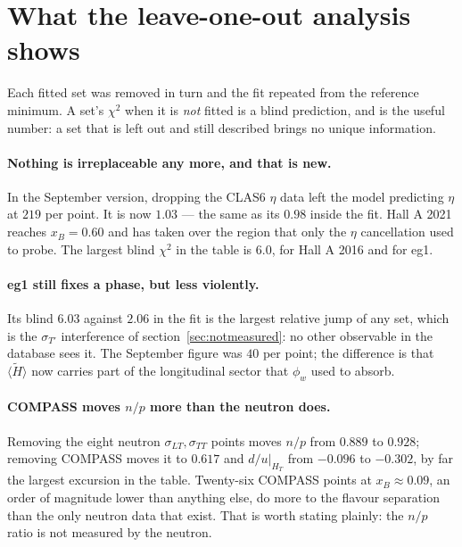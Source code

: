 \documentclass[11pt,a4paper]{article}
\newcommand{\sig}[1]{\sigma_{#1}}
\begin{document}
\section{What the leave-one-out analysis shows}

Each fitted set was removed in turn and the fit repeated from the reference
minimum.  A set's $\chi^2$ when it is \emph{not} fitted is a blind prediction,
and is the useful number: a set that is left out and still described brings no
unique information.

\begin{table}[htb]
\centering\small
\caption{Blind $\chi^2$ per point of the removed set, against its $\chi^2$ per
point in the reference fit, and the effect on two derived quantities.  Sorted
by blind $\chi^2$.}
\label{tab:loo}

\end{table}

\paragraph{Nothing is irreplaceable any more, and that is new.}  In the
September version, dropping the CLAS6 $\eta$ data left the model predicting
$\eta$ at $219$ per point.  It is now $1.03$ --- the same as its $0.98$ inside
the fit.  Hall A 2021 reaches $x_B = 0.60$ and has taken over the region that
only the $\eta$ cancellation used to probe.  The largest blind $\chi^2$ in the
table is $6.0$, for Hall A 2016 and for eg1.

\paragraph{eg1 still fixes a phase, but less violently.}  Its blind $6.03$
against $2.06$ in the fit is the largest relative jump of any set, which is the
$\sig{T'}$ interference of section~\ref{sec:notmeasured}: no other observable in
the database sees it.  The September figure was $40$ per point; the difference
is that $\langle\tilde H\rangle$ now carries part of the longitudinal sector
that $\phi_w$ used to absorb.

\paragraph{COMPASS moves $n/p$ more than the neutron does.}  Removing the eight
neutron $\sig{LT},\sig{TT}$ points moves $n/p$ from $0.889$ to $0.928$;
removing COMPASS moves it to $0.617$ and $d/u|_{H_T}$ from $-0.096$ to $-0.302$,
by far the largest excursion in the table.  Twenty-six COMPASS points at
$x_B \approx 0.09$, an order of magnitude lower than anything else, do more to
the flavour separation than the only neutron data that exist.  That is worth
stating plainly: the $n/p$ ratio is not measured by the neutron.
\end{document}
